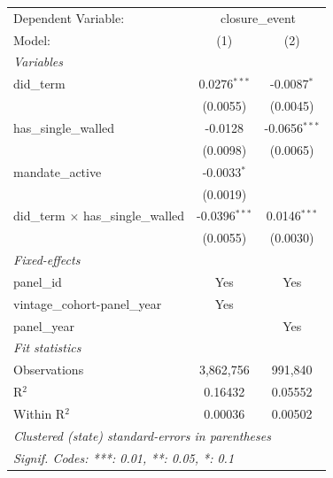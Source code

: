 
\begingroup
\centering
\begin{tabular}{lcc}
   \tabularnewline \midrule \midrule
   Dependent Variable: & \multicolumn{2}{c}{closure\_event}\\
   Model:                                     & (1)             & (2)\\  
   \midrule
   \emph{Variables}\\
   did\_term                                  & 0.0276$^{***}$  & -0.0087$^{*}$\\   
                                              & (0.0055)        & (0.0045)\\   
   has\_single\_walled                        & -0.0128         & -0.0656$^{***}$\\   
                                              & (0.0098)        & (0.0065)\\   
   mandate\_active                            & -0.0033$^{*}$   &   \\   
                                              & (0.0019)        &   \\   
   did\_term $\times$ has\_single\_walled     & -0.0396$^{***}$ & 0.0146$^{***}$\\   
                                              & (0.0055)        & (0.0030)\\   
   \midrule
   \emph{Fixed-effects}\\
   panel\_id                                  & Yes             & Yes\\  
   vintage\_cohort-panel\_year                & Yes             & \\  
   panel\_year                                &                 & Yes\\  
   \midrule
   \emph{Fit statistics}\\
   Observations                               & 3,862,756       & 991,840\\  
   R$^2$                                      & 0.16432         & 0.05552\\  
   Within R$^2$                               & 0.00036         & 0.00502\\  
   \midrule \midrule
   \multicolumn{3}{l}{\emph{Clustered (state) standard-errors in parentheses}}\\
   \multicolumn{3}{l}{\emph{Signif. Codes: ***: 0.01, **: 0.05, *: 0.1}}\\
\end{tabular}
\par\endgroup


